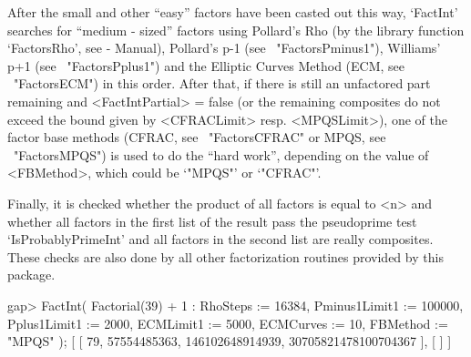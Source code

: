 After the small and other ``easy'' factors have been casted out 
this way, `FactInt' searches for ``medium - sized'' factors using
Pollard's Rho (by the library function `FactorsRho',
see {\GAP} - Manual),
Pollard's p-1 (see ~"FactorsPminus1"), Williams' p+1 
(see ~"FactorsPplus1") and the Elliptic Curves Method 
(ECM, see ~"FactorsECM") in this order.
After that, if there is still an unfactored part remaining and
<FactIntPartial> = false (or the remaining composites do not
exceed the bound given by <CFRACLimit> resp. <MPQSLimit>), 
one of the factor base methods (CFRAC, see ~"FactorsCFRAC" or 
MPQS, see ~"FactorsMPQS") is used to do the ``hard work'', depending
on the value of <FBMethod>, which could be `"MPQS"' or `"CFRAC"'.

Finally, it is checked whether the product of all factors
is equal to <n> and whether all factors in the first list of the
result pass the {\GAP} pseudoprime test `IsProbablyPrimeInt'
and all factors in the second list are really composites.
These checks are also done by all other factorization routines
provided by this package.  

\beginexample
gap> FactInt( Factorial(39) + 1 : RhoSteps := 16384, Pminus1Limit1 := 100000,
              Pplus1Limit1 := 2000, ECMLimit1 := 5000, ECMCurves := 10,
              FBMethod := "MPQS" );
[ [ 79, 57554485363, 146102648914939, 30705821478100704367 ], [  ] ]
\endexample

